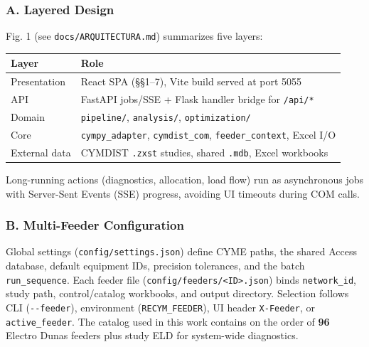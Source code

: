 \documentclass[
  11pt,
]{article}
\newcounter{none} %
\begin{document}
\subsubsection{A. Layered Design}\label{a.-layered-design}

Fig. 1 (see \texttt{docs/ARQUITECTURA.md}) summarizes five layers:

{\def\LTcaptype{none} %
\begin{longtable}[]{@{}
  >{\raggedright\arraybackslash}p{}
  >{\raggedright\arraybackslash}p{}@{}}
\toprule\noalign{}
\begin{minipage}[b]{\linewidth}\raggedright
Layer
\end{minipage} & \begin{minipage}[b]{\linewidth}\raggedright
Role
\end{minipage} \\
\midrule\noalign{}
\endhead
\bottomrule\noalign{}
\endlastfoot
Presentation & React SPA (§§1–7), Vite build served at port 5055 \\
API & FastAPI jobs/SSE + Flask handler bridge for \texttt{/api/*} \\
Domain & \texttt{pipeline/}, \texttt{analysis/},
\texttt{optimization/} \\
Core & \texttt{cympy\_adapter}, \texttt{cymdist\_com},
\texttt{feeder\_context}, Excel I/O \\
External data & CYMDIST \texttt{.zxst} studies, shared \texttt{.mdb},
Excel workbooks \\
\end{longtable}
}

Long-running actions (diagnostics, allocation, load flow) run as
asynchronous jobs with Server-Sent Events (SSE) progress, avoiding UI
timeouts during COM calls.

\subsubsection{B. Multi-Feeder
Configuration}\label{b.-multi-feeder-configuration}

Global settings (\texttt{config/settings.json}) define CYME paths, the
shared Access database, default equipment IDs, precision tolerances, and
the batch \texttt{run\_sequence}. Each feeder file
(\texttt{config/feeders/\textless{}ID\textgreater{}.json}) binds
\texttt{network\_id}, study path, control/catalog workbooks, and output
directory. Selection follows CLI (\texttt{-\/-feeder}), environment
(\texttt{RECYM\_FEEDER}), UI header \texttt{X-Feeder}, or
\texttt{active\_feeder}. The catalog used in this work contains on the
order of \textbf{96} Electro Dunas feeders plus study ELD for
system-wide diagnostics.
\end{document}
